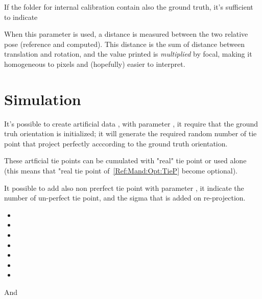 \documentclass[a4paper]{article}
\begin{document}
If the folder for internal calibration contain also the ground truth, it's sufficient to indicate

When this parameter is used, a distance is measured between the two relative pose (reference
and computed). This distance is the sum of distance between translation and rotation,
and the value printed is \emph{multiplied} by focal, making it homogeneous to pixels
and (hopefully) easier to interpret.


\section{Simulation}

It's possible to create artificial data , with parameter ,
it require that the ground truh orientation is initialized; it will generate
the required random number of tie point that project perfectly  acccording
to the ground truth orientation.

These artficial tie points can be cumulated with "real" tie point or used
alone (this means that "real tie point of~\ref{Ref:Mand:Opt:TieP} become optional).

It possible to add also non prerfect tie point with  parameter ,
it indicate the number of un-perfect tie point, and the sigma that is added
on re-projection.



\SecRelatedCmd

\begin{itemize}
   \item  {}
   \item  {}
   \item  {}
   \item  {}
   \item  {}
   \item  {}
   \item  {}
\end{itemize}

And 
\end{document}
